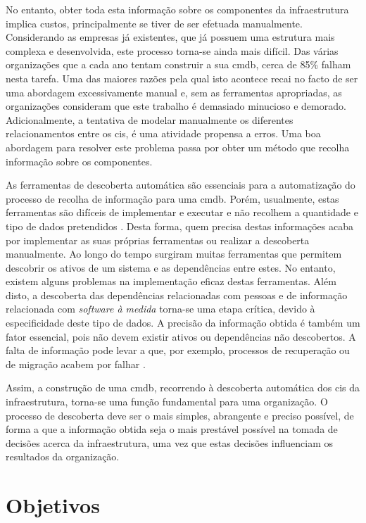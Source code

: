 \documentclass[
  oneside,
  11pt, a4paper,
  footinclude=true,
  headinclude=true,
  cleardoublepage=empty
]{scrbook}
\begin{document}
No entanto, obter toda esta informação sobre os componentes da infraestrutura implica custos, principalmente se tiver de ser efetuada manualmente. Considerando as empresas já existentes, que já possuem uma estrutura mais complexa e desenvolvida, este processo torna-se ainda mais difícil. Das várias organizações que a cada ano tentam construir a sua \gls{cmdb}, cerca de 85\% falham nesta tarefa. Uma das maiores razões pela qual isto acontece recai no facto de ser uma abordagem excessivamente manual e, sem as ferramentas apropriadas, as organizações consideram que este trabalho é demasiado minucioso e demorado\cite{forbes}. Adicionalmente, a tentativa de modelar manualmente os diferentes relacionamentos entre os \glspl{ci}, é uma atividade propensa a erros. Uma boa abordagem para resolver este problema passa por obter um método que recolha informação sobre os componentes.

As ferramentas de descoberta automática são essenciais para a automatização do processo de recolha de informação para uma \gls{cmdb}. Porém, usualmente, estas ferramentas são difíceis de implementar e executar e não recolhem a quantidade e tipo de dados pretendidos \cite{taddm}. Desta forma, quem precisa destas informações acaba por implementar as suas próprias ferramentas ou realizar a descoberta manualmente. Ao longo do tempo surgiram muitas ferramentas que permitem descobrir os ativos de um sistema e as dependências entre estes. No entanto, existem alguns problemas na implementação eficaz destas ferramentas. Além disto, a descoberta das dependências relacionadas com pessoas e de informação relacionada com \textit{software à medida} torna-se uma etapa crítica, devido à especificidade deste tipo de dados. A precisão da informação obtida é também um fator essencial, pois não devem existir ativos ou dependências não descobertos. A falta de informação pode levar a que, por exemplo, processos de recuperação ou de migração acabem por falhar \cite{taddm}.

Assim, a construção de uma \gls{cmdb}, recorrendo à descoberta automática dos \glspl{ci} da infraestrutura, torna-se uma função fundamental para uma organização. O processo de descoberta deve ser o mais simples, abrangente e preciso possível, de forma a que a informação obtida seja o mais prestável possível na tomada de decisões acerca da infraestrutura, uma vez que estas decisões influenciam os resultados da organização.
	
	\section{Objetivos}
	
\end{document}
